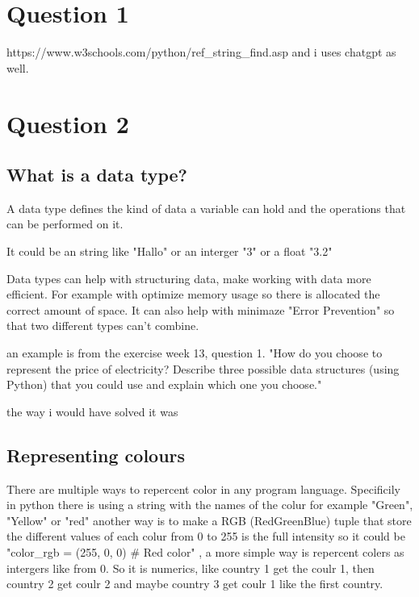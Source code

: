\documentclass{article}
\begin{document}
\section{Question 1}


https://www.w3schools.com/python/ref_string_find.asp and i uses chatgpt as well. 



\section{Question 2}


\subsection{What is a data type?}

A data type defines the kind of data a variable can hold and the operations that can be performed on it. 

It could be an string like "Hallo" or an interger "3" or a float "3.2" 

Data types can help with structuring data, make working with data more efficient. For example with optimize memory usage so there is allocated the correct amount of space. It can also help with minimaze "Error Prevention" so that two different types can't combine.

an example is from the exercise week 13, question 1. "How do you choose to represent the price of electricity? Describe three possible data structures (using Python) that you could use and explain which one you choose."


the way i would have solved it was



\subsection{Representing colours}


There are multiple ways to repercent color in any program language. Specificily in python there is using a string with the names of the colur for example "Green", "Yellow" or "red" another way is to make a RGB (RedGreenBlue) tuple that store the different values of each colur from 0 to 255 is the full intensity so it could be "color_rgb = (255, 0, 0)  # Red color" , a more simple way is repercent colers as intergers like from 0. So it is numerics, like country 1 get the coulr 1, then country 2 get coulr 2 and maybe country 3 get coulr 1 like the first country. 
\end{document}
